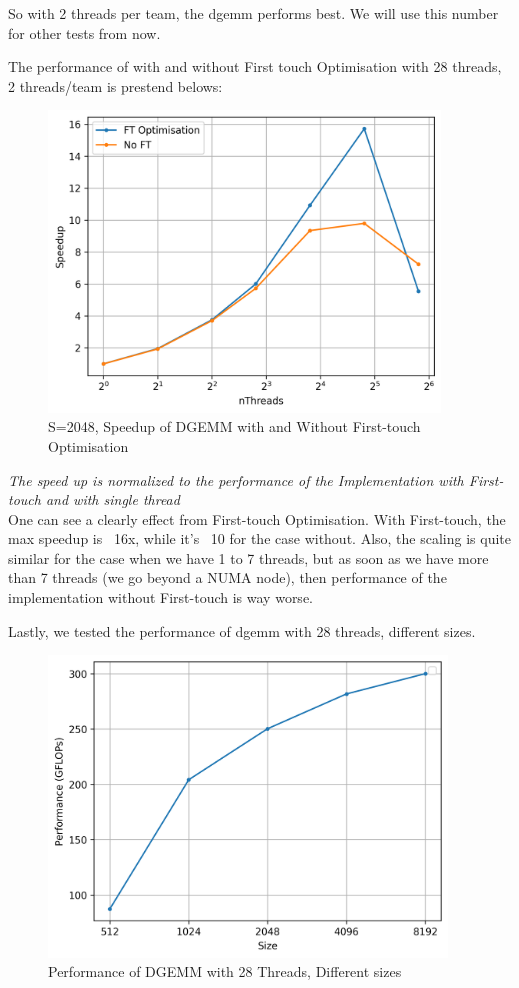 \documentclass[article]{scrartcl}
\begin{document}
So with 2 threads per team, the dgemm performs best. We will use this number for other tests from now.

The performance of with and without First touch Optimisation with 28 threads, 2 threads/team is prestend belows:


\begin{figure}[htpb]
    \centering
    \includegraphics[width=\textwidth,height=8cm,keepaspectratio=true]{../figs/4.2_CompareNoFT.png}
    \caption{S=2048, Speedup of DGEMM with and Without First-touch Optimisation}
    \label{fig:dgemm3}
\end{figure}
\textit{The speed up is normalized to the performance of the Implementation with First-touch and with single thread} \\
One can see a clearly effect from First-touch Optimisation. With First-touch, the max speedup is ~16x, while it's ~10 for the case without. Also, the scaling is quite similar for the case when we have 1 to 7 threads, but as soon as we have more than 7 threads (we go beyond a NUMA node), then performance of the implementation without First-touch is way worse.

Lastly, we tested the performance of dgemm with 28 threads, different sizes. 
\begin{figure}[htpb]
    \centering
    \includegraphics[width=\textwidth,height=8cm,keepaspectratio=true]{../figs/4.28Threads.png}
    \caption{Performance of DGEMM with 28 Threads, Different sizes}
    \label{fig:dgemm3}
\end{figure}
\end{document}
